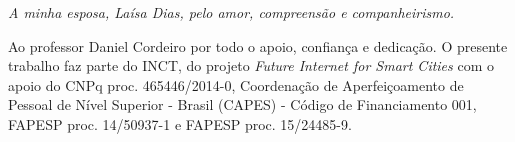 \documentclass[
	12pt,				%
	oneside,			%
	a4paper,			%
	english,			%
	brazil				%
	]{abntex2ppgsi}
\begin{document}
\begin{folhadeaprovacao}
\begin{center}




\end{center}
  
\end{folhadeaprovacao}

%
% 
\begin{dedicatoria}
   \vspace*{\fill}
   \centering
   \noindent
   \textit{A minha esposa, Laísa Dias, pelo amor, compreensão e companheirismo.} 
	 \vspace*{\fill}
\end{dedicatoria}

%
% 
%
\begin{agradecimentos}
Ao professor Daniel Cordeiro por todo o apoio, confiança e dedicação. O presente trabalho faz parte do INCT, do projeto \textit{Future Internet for Smart
Cities} com o apoio do CNPq proc. 465446/2014-0, Coordenação de
Aperfeiçoamento de Pessoal de Nível Superior - Brasil (CAPES) -
Código de Financiamento 001, FAPESP proc. 14/50937-1 e FAPESP proc.
15/24485-9.

\end{agradecimentos}
\end{document}
